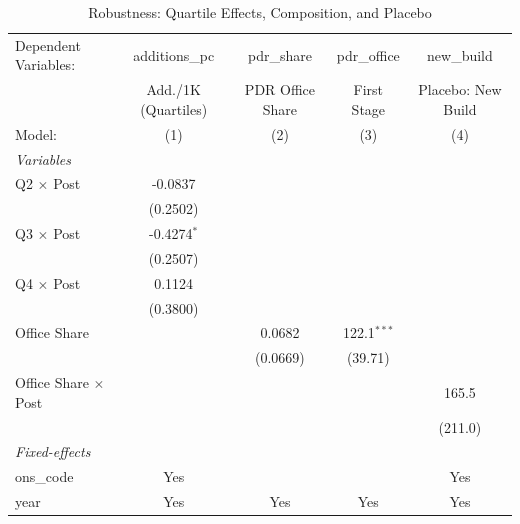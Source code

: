 
\begin{table}[htbp]
   \caption{\label{tab:robustness} Robustness: Quartile Effects, Composition, and Placebo}
   \centering
   \footnotesize\begin{tabular}{lcccc}
      \tabularnewline \midrule \midrule
      Dependent Variables:        & additions\_pc       & pdr\_share       & pdr\_office   & new\_build\\   
                                  & Add./1K (Quartiles) & PDR Office Share & First Stage   & Placebo: New Build \\   
      Model:                      & (1)                 & (2)              & (3)           & (4)\\  
      \midrule
      \emph{Variables}\\
      Q2 $\times$ Post            & -0.0837             &                  &               &   \\   
                                  & (0.2502)            &                  &               &   \\   
      Q3 $\times$ Post            & -0.4274$^{*}$       &                  &               &   \\   
                                  & (0.2507)            &                  &               &   \\   
      Q4 $\times$ Post            & 0.1124              &                  &               &   \\   
                                  & (0.3800)            &                  &               &   \\   
      Office Share                &                     & 0.0682           & 122.1$^{***}$ &   \\   
                                  &                     & (0.0669)         & (39.71)       &   \\   
      Office Share $\times$ Post  &                     &                  &               & 165.5\\   
                                  &                     &                  &               & (211.0)\\   
      \midrule
      \emph{Fixed-effects}\\
      ons\_code                   & Yes                 &                  &               & Yes\\  
      year                        & Yes                 & Yes              & Yes           & Yes\\  
      \midrule

\end{tabular}
\end{table}
